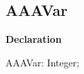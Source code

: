 \documentclass{report}
\newif\ifpdf
\begin{document}
\subsection*{AAAVar}
\fi
\label{ok_sorting-AAAVar}
\begin{list}{}{
\setlength{\itemindent}{0cm}
\setlength{\listparindent}{0cm}
\setlength{\leftmargin}{\evensidemargin}
\addtolength{\leftmargin}{\tmplength}
\settowidth{\labelsep}{X}
\addtolength{\leftmargin}{\labelsep}
\setlength{\labelwidth}{\tmplength}
}
\item[\textbf{Declaration}\hfill]
\ifpdf
\begin{flushleft}
\fi
\begin{ttfamily}
AAAVar: Integer;\end{ttfamily}

\ifpdf
\end{flushleft}
\fi

\end{list}
\end{document}
